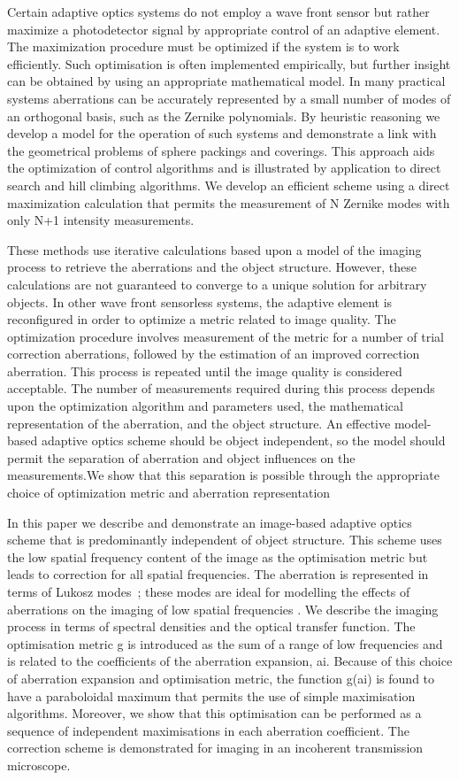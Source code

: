 Certain adaptive optics systems do not employ a wave front sensor but rather 
maximize a photodetector signal by appropriate control of an adaptive 
element. The maximization procedure must be optimized if the system is to 
work efficiently. Such optimisation is often implemented empirically, but 
further insight can be obtained by using an appropriate mathematical model. 
In many practical systems aberrations can be accurately represented by a 
small number of modes of an orthogonal basis, such as the Zernike 
polynomials. By heuristic reasoning we develop a model for the operation of 
such systems and demonstrate a link with the geometrical problems of sphere 
packings and coverings. This approach aids the optimization of control 
algorithms and is illustrated by application to direct search and hill 
climbing algorithms. We develop an efficient scheme using a direct 
maximization calculation that permits the measurement of N Zernike modes with 
only N+1 intensity measurements.

These methods use iterative calculations based upon a model of the imaging 
process to retrieve the aberrations and the object structure. However, these 
calculations are not guaranteed to converge to a unique solution for 
arbitrary objects. In other wave front sensorless systems, the adaptive 
element is reconfigured in order to optimize a metric related to image 
quality. The optimization procedure involves measurement of the metric for a 
number of trial correction aberrations, followed by the estimation of an 
improved correction aberration. This process is repeated until the image 
quality is considered acceptable. The number of measurements required during 
this process depends upon the optimization algorithm and parameters used, the 
mathematical representation of the aberration, and the object structure. An 
effective model-based adaptive optics scheme should be object independent, so 
the model should permit the separation of aberration and object influences on 
the measurements.We show that this separation is possible through the 
appropriate choice of optimization metric and aberration representation

In this paper we describe and demonstrate an image-based adaptive optics 
scheme that is predominantly independent of object structure. This scheme 
uses the low spatial frequency content of the image as the optimisation 
metric but leads to correction for all spatial frequencies. The aberration is 
represented in terms of Lukosz modes~\cite{wide_Lukosz_Modes}; these modes 
are ideal for modelling the effects of aberrations on the imaging of low 
spatial frequencies . We describe the imaging process in terms of spectral 
densities and the optical transfer function. The optimisation metric g is 
introduced as the sum of a range of low frequencies and is related to the 
coefficients of the aberration expansion, {ai}. Because of this choice of 
aberration expansion and optimisation metric, the function g({ai}) is found 
to have a paraboloidal maximum that permits the use of simple maximisation 
algorithms. Moreover, we show that this optimisation can be performed as a 
sequence of independent maximisations in each aberration coefficient. The 
correction scheme is demonstrated for imaging in an incoherent transmission 
microscope.

